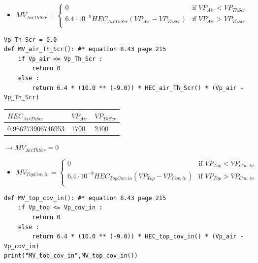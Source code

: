 \documentclass[a4paper]{article}
\numberwithin{equation}{section}
\begin{document}
\begin{itemize}
    \item $  MV_{AirThScr}   = \begin{cases}
    0                                                       & \text{if~} VP_{Air} < VP_{ThScr} \\
    6.4 \cdot 10^{-9} HEC_{AirThScr}(VP_{Air} - VP_{ThScr}) & \text{if~} VP_{Air} > VP_{ThScr} \\
  \end{cases}  $
\end{itemize}
\begin{mdframed}[leftline=false,rightline=false,backgroundcolor=cyan!10]
  \begin{verbatim}
Vp_Th_Scr = 0.0
def MV_air_Th_Scr(): #* equation 8.43 page 215
    if Vp_air <= Vp_Th_Scr :
        return 0
    else :
        return 6.4 * (10.0 ** (-9.0)) * HEC_air_Th_Scr() * (Vp_air - Vp_Th_Scr) 
\end{verbatim}
\end{mdframed}

\begin{table}[H]
\centering
\begin{tabular}{|l|l|l|}
\hline
\rowcolor[HTML]{FFFC9E}
\cellcolor[HTML]{FFFC9E}\textbf{$HEC_{AirThScr}$} &
 \cellcolor[HTML]{FFFC9E}\textbf{$VP_{Air}$}& \cellcolor[HTML]{FFFC9E}\textbf{$VP_{ThScr}$}\\ \hline
0.966273906746953            & 1700               & 2400                         \\ \hline
\end{tabular}
\end{table}
$\rightarrow MV_{AirThScr} = 0$


\begin{itemize}
    \item $  MV_{TopCov,in} = \begin{cases}
    0                                                         & \text{if~} VP_{Top} < VP_{Cov,in} \\
    6.4 \cdot 10^{-9} HEC_{TopCov,in}(VP_{Top} - VP_{Cov,in}) & \text{if~} VP_{Top} > VP_{Cov,in} \\
  \end{cases}  $
\end{itemize}
\begin{mdframed}[leftline=false,rightline=false,backgroundcolor=cyan!10]
  \begin{verbatim}
def MV_top_cov_in(): #* equation 8.43 page 215
    if Vp_top <= Vp_cov_in :
        return 0
    else :
        return 6.4 * (10.0 ** (-9.0)) * HEC_top_cov_in() * (Vp_air - Vp_cov_in)
print("MV_top_cov_in",MV_top_cov_in())
\end{verbatim}
\end{mdframed}
\end{document}
